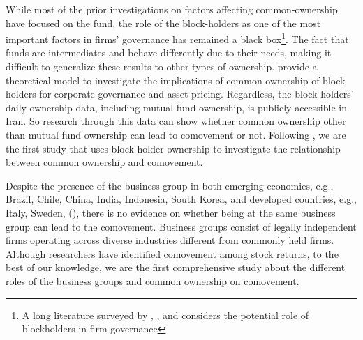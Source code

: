 While most of the prior investigations on factors affecting common-ownership have focused on the fund, the role of the block-holders as one of the most important factors in firms' governance has remained a black box\footnote{A long literature surveyed by \cite{holderness2003survey}, \cite{edmans2014blockholders}, and \cite{edmans2017blockholders} considers the potential role of blockholders in firm governance}. 
The fact that funds are intermediates and behave differently due to their needs, making it difficult to generalize these results to other types of ownership.  \cite{edmans2014governance} provide a theoretical model to investigate the implications of common ownership of block holders for corporate governance and asset pricing.  Regardless, the block holders' daily ownership data, including mutual fund ownership, is publicly accessible in Iran. So research through this data can show whether common ownership other than mutual fund ownership can lead to comovement or not. Following \cite{AntonPolk}, we are the first study that uses block-holder ownership to investigate the relationship between common ownership and comovement.  
	
	

Despite the presence of the business group in both emerging economies, e.g., Brazil, Chile, China, India, Indonesia, South Korea, and developed countries, e.g., Italy, Sweden, (\cite{khanna2007business}), there is no evidence on whether being at the same business group can lead to the comovement.  Business groups consist of legally independent firms operating across diverse industries different from commonly held firms. Although researchers have identified comovement among stock
returns,  to the best of our knowledge, we are the first comprehensive study about the different roles of the business groups and common ownership on comovement. 

